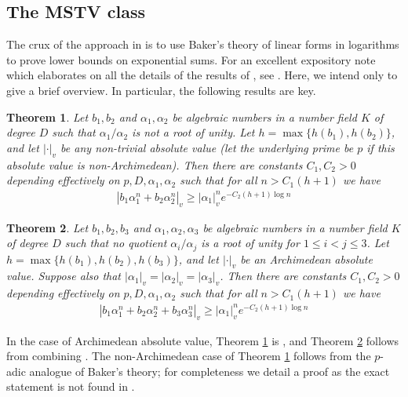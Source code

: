 \documentclass{article}\usepackage[a4paper,margin=20mm]{geometry}
\newtheorem{theorem}{Theorem}\newtheorem{lemma}[theorem]{Lemma}\newtheorem{proposition}[theorem]{Proposition}\newtheorem{corollary}[theorem]{Corollary}\newtheorem{definition}[theorem]{Definition}\newtheorem{claim}[theorem]{Claim}\newtheorem{remark}[theorem]{Remark}\newtheorem{observation}[theorem]{Observation}\newtheorem{conjecture}[theorem]{Conjecture}\newtheorem{example}[theorem]{Example}
\begin{document}
\subsection{The MSTV class}
The crux of the approach in \cite{Mignotte_distance,Vereshchagin} is to use Baker's theory of linear forms in logarithms to prove lower bounds on exponential sums. For an excellent expository note which elaborates on all the details of the results of \cite{Mignotte_distance,Vereshchagin}, see \cite{bilu_skolem_2025}. Here, we intend only to give a brief overview. In particular, the following results are key.
\begin{theorem} \label{thm:2_sum}
Let $b_1,b_2$ and $\alpha_1,\alpha_2$ be algebraic numbers in a number field $K$ of degree $D$ such that $\alpha_1/\alpha_2$ is not a root of unity. Let $h = \max\{h(b_1), h(b_2)\}$, and let $|\cdot|_v$ be any non-trivial absolute value (let the underlying prime be $p$ if this absolute value is non-Archimedean). Then there are constants $C_1,C_2 > 0$ depending effectively on $p,D, \alpha_1, \alpha_2$ such that for all $n > C_1 (h+1)$ we have
\begin{align} \label{eqn:2_sum}
    |b_1 \alpha_1^n + b_2 \alpha_2^n|_v \geq |\alpha_1|_v^n e^{-C_2 (h+1) \log n}
\end{align}
\end{theorem}
\begin{theorem} \label{thm:3_sum}
Let $b_1,b_2,b_3$ and $\alpha_1,\alpha_2,\alpha_3$ be algebraic numbers in a number field $K$ of degree $D$ such that no quotient $\alpha_i/\alpha_j$ is a root of unity for $1 \leq i < j \leq 3$. Let $h = \max\{h(b_1), h(b_2),h(b_3)\}$, and let $|\cdot|_v$ be an Archimedean absolute value. Suppose also that $|\alpha_1|_v = |\alpha_2|_v = |\alpha_3|_v$. Then there are constants $C_1,C_2 > 0$ depending effectively on $p,D, \alpha_1, \alpha_2$ such that for all $n > C_1 (h+1)$ we have
\begin{align}
    |b_1 \alpha_1^n + b_2 \alpha_2^n + b_3 \alpha_3^n|_v \geq |\alpha_1|_v^n e^{-C_2 (h+1) \log n}
\end{align}
\end{theorem}
In the case of Archimedean absolute value, Theorem \ref{thm:2_sum} is \cite[Corollary 2]{Mignotte_distance}, and Theorem \ref{thm:3_sum} follows from combining \cite[Theorems 4, 5]{Mignotte_distance}. The non-Archimedean case of Theorem \ref{thm:2_sum} follows from the $p$-adic analogue of Baker's theory; for completeness we detail a proof as the exact statement is not found in \cite{Mignotte_distance}.
\end{document}
